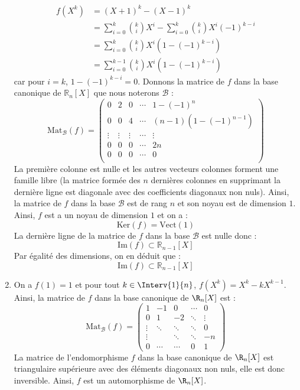 \documentclass[a4paper,10pt]{report}
\begin{document}
\begin{enumerate}
\begin{align*}
f(X^k) & = (X+1)^k - (X-1)^k \\
& = \sum_{i=0}^k \binom{k}{i} X^i - \sum_{i=0}^k \binom{k}{i} X^i (-1)^{k-i} \\
& =\sum_{i=0}^k \binom{k}{i} X^i  (1-(-1)^{k-i}) \\
& =\sum_{i=0}^{k-1} \binom{k}{i} X^i  (1-(-1)^{k-i}) 
\end{align*}
car pour $i=k$, $1-(-1)^{k-i}=0$. Donnons la matrice de $f$ dans la base canonique de $\mathbb{R}_n[X]$ que nous noterons $\mathcal{B}$ :
$$ \textrm{Mat}_{\mathcal{B}}(f) = \begin{pmatrix}
0 &   2 & 0 &  \cdots & 1-(-1)^n  \\
0 &  0  & 4 & \cdots &  (n-1) (1-(-1)^{n-1}) \\
\vdots & \vdots & \vdots & \cdots &  \vdots \\
0 &  0 & 0 &  \cdots & 2n  \\
0 &  0 & 0 &  \cdots& 0 \\
\end{pmatrix}$$
La première colonne est nulle et les autres vecteurs colonnes forment une famille libre (la matrice formée des $n$ dernières colonnes en supprimant la dernière ligne est diagonale avec des coefficients diagonaux non nuls). Ainsi, la matrice de $f$ dans la base $\mathcal{B}$ est de rang $n$ et son noyau est de dimension $1$. Ainsi, $f$ est a un noyau de dimension $1$ et on a :
$$ \textrm{Ker}(f) = \textrm{Vect}(1) $$
La dernière ligne de la matrice de $f$ dans la base $\mathcal{B}$ est nulle donc :
$$ \textrm{Im}(f) \subset \mathbb{R}_{n-1}[X]$$
Par égalité des dimensions, on en déduit que :
$$  \textrm{Im}(f) \subset \mathbb{R}_{n-1}[X]$$
\item On a $f(1)=1$ et pour tout $k \in \Interv{1}{n}$, $f(X^k)=X^k-kX^{k-1}$. Ainsi, la matrice de $f$ dans la base canonique de $\R_n[X]$ est : 
$$\textrm{Mat}_{\mathcal{B}}(f)=\begin{pmatrix}
1&-1&0&\cdots&0\\0&1&-2&\ddots&\vdots\\ \vdots&\ddots&\ddots&\ddots&0\\\vdots&&\ddots&\ddots&-n\\0&\cdots&\cdots&0&1
\end{pmatrix}$$
La matrice de l'endomorphisme $f$ dans la base canonique de $\R_n[X]$ est triangulaire supérieure avec des éléments diagonaux non nuls, elle est donc inversible. Ainsi, $f$ est un automorphisme de $\R_n[X]$.
\end{enumerate}
\end{document}
